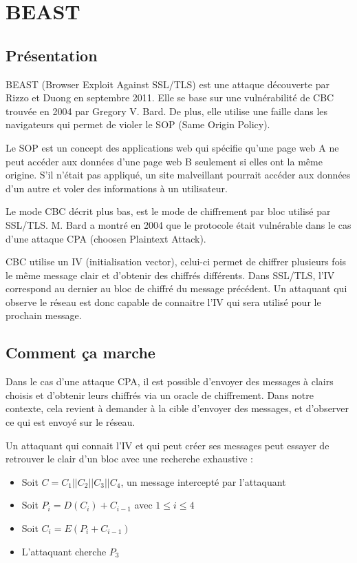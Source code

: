 \chapter{BEAST}
\label{chapter:Beast}

\section{Présentation}
\label{sec:pBeast}

BEAST (Browser Exploit Against SSL/TLS) est une attaque  découverte par Rizzo et Duong en septembre 2011.
Elle se base sur une vulnérabilité de CBC trouvée en 2004 par Gregory V. Bard. De plus, elle utilise une faille dans les
navigateurs qui permet de violer le SOP (Same Origin Policy).

Le SOP est un concept des applications web qui spécifie qu'une page web A ne peut accéder aux données d'une page web
B seulement si elles ont la même origine. S'il n'était pas appliqué, un site malveillant pourrait accéder aux
données d'un autre et voler des informations à un utilisateur.

Le mode CBC décrit plus bas\up{\ref{fig:cbc}}, est le mode de chiffrement par bloc utilisé par SSL/TLS. 
M. Bard a montré en 2004 que le protocole était vulnérable dans le cas d'une attaque CPA (choosen Plaintext Attack).

CBC utilise un IV (initialisation vector), celui-ci permet de chiffrer plusieurs fois le même message clair
et d'obtenir des chiffrés différents. Dans SSL/TLS, l'IV correspond au dernier au bloc de chiffré du message précédent.
Un attaquant qui observe le réseau est donc capable de connaitre l'IV qui sera utilisé pour le prochain message.

\section{Comment ça marche}
\label{sec:ccmBeast}

Dans le cas d'une attaque CPA, il est possible d'envoyer des messages à clairs choisis et d'obtenir leurs chiffrés
via un oracle de chiffrement. Dans notre contexte, cela revient à demander à la cible d'envoyer des messages, et
d'observer ce qui est envoyé sur le réseau.

Un attaquant qui connait l'IV et qui peut créer ses messages peut essayer de retrouver le clair d'un bloc avec une 
recherche exhaustive :

\begin{itemize}
\item Soit $C = C_1 || C_2 || C_3 || C_4$, un message intercepté par l'attaquant
\item Soit $P_i = D(C_i) + C_{i-1}$ avec $1 \leq i \leq 4$ 
\item Soit $C_i = E(P_i + C_{i-1}) $
\item L'attaquant cherche $P_3$
\end{itemize}

